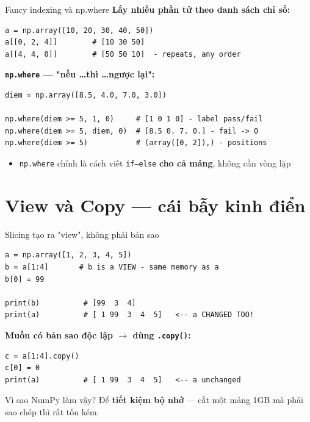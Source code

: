 \documentclass[11pt]{beamer}
\begin{document}
\begin{frame}[fragile]{Fancy indexing và np.where}
\textbf{Lấy nhiều phần tử theo danh sách chỉ số:}
\begin{lstlisting}
a = np.array([10, 20, 30, 40, 50])
a[[0, 2, 4]]        # [10 30 50]
a[[4, 4, 0]]        # [50 50 10]  - repeats, any order
\end{lstlisting}
\textbf{\texttt{np.where} --- "nếu \ldots thì \ldots ngược lại":}
\begin{lstlisting}
diem = np.array([8.5, 4.0, 7.0, 3.0])

np.where(diem >= 5, 1, 0)     # [1 0 1 0] - label pass/fail
np.where(diem >= 5, diem, 0)  # [8.5 0. 7. 0.] - fail -> 0
np.where(diem >= 5)           # (array([0, 2]),) - positions
\end{lstlisting}
\begin{itemize}
  \item \texttt{np.where} chính là cách viết \texttt{if--else} \textbf{cho cả mảng}, không cần vòng lặp
\end{itemize}
\end{frame}

\section{View và Copy --- cái bẫy kinh điển}

\begin{frame}[fragile]{Slicing tạo ra "view", không phải bản sao}
\begin{lstlisting}
a = np.array([1, 2, 3, 4, 5])
b = a[1:4]       # b is a VIEW - same memory as a
b[0] = 99

print(b)          # [99  3  4]
print(a)          # [ 1 99  3  4  5]   <-- a CHANGED TOO!
\end{lstlisting}
\pause
\textbf{Muốn có bản sao độc lập $\to$ dùng \texttt{.copy()}:}
\begin{lstlisting}
c = a[1:4].copy()
c[0] = 0
print(a)          # [ 1 99  3  4  5]   <-- a unchanged
\end{lstlisting}
\begin{block}{Vì sao NumPy làm vậy?}
Để \textbf{tiết kiệm bộ nhớ} --- cắt một mảng 1GB mà phải sao chép thì rất tốn kém.
\end{block}
\end{frame}
\end{document}
